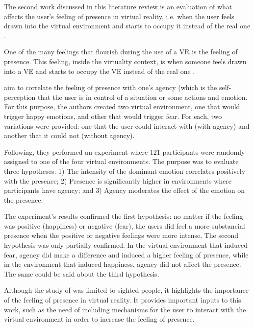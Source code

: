 The second work discussed in this literature review is an evaluation of what affects the user's feeling of presence in virtual reality, i.e. when the user feels drawn into the virtual environment and starts to occupy it instead of the real one \cite{cummings2016immersive}.

One of the many feelings that flourish during the use of a VR is the feeling of presence. This feeling, inside the virtuality context, is when someone feels drawn into a VE and starts to occupy the VE instead of the real one \cite{cummings2016immersive}.

 aim to correlate the feeling of presence with one's agency (which is the self-perception that the user is in control of a situation or some actions \cite{farrer2002experiencing} and emotion. For this purpose, the authors created two virtual environment, one that would trigger happy emotions, and other that would trigger fear. For each, two variations were provided: one that the user could interact with (with agency) and another that it could not (without agency).

Following, they performed an experiment where 121 participants were randomly assigned to one of the four virtual environments. The purpose was to evaluate three hypotheses: 1) The intensity of the dominant emotion correlates positively with the presence; 2) Presence is significantly higher in environments where participants have agency; and 3) Agency moderates the effect of the emotion on the presence.

The experiment's results confirmed the first hypothesis: no matter if the feeling was positive (happiness) or negative (fear), the users did feel a more substancial presence when the positive or negative feelings were more intense. The second hypothesis was only partially confirmed. In the virtual environment that induced fear, agency did make a difference and induced a higher feeling of presence, while in the environment that induced happiness, agency did not affect the presence. The same could be said about the third hypothesis.

Although the study of  was limited to sighted people, it highlights the importance of the feeling of presence in virtual reality. It provides important inputs to this work, such as the need of including mechanisms for the user to interact with the virtual environment in order to increase the feeling of presence. 
